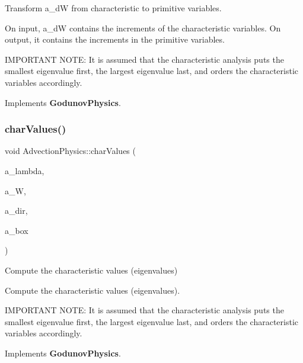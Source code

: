 Transform a\+\_\+dW from characteristic to primitive variables. 

On input, a\+\_\+dW contains the increments of the characteristic variables. On output, it contains the increments in the primitive variables.

I\+M\+P\+O\+R\+T\+A\+NT N\+O\+TE\+: It is assumed that the characteristic analysis puts the smallest eigenvalue first, the largest eigenvalue last, and orders the characteristic variables accordingly. 

Implements \textbf{ Godunov\+Physics}.

\mbox{\label{class_advection_physics_ac3c19f3db60ae92b995ff3d0cdc3f8dc}} 
\subsubsection{\texorpdfstring{char\+Values()}{charValues()}}
{\footnotesize\ttfamily void Advection\+Physics\+::char\+Values (\begin{DoxyParamCaption}\item[{\textbf{ F\+Array\+Box} \&}]{a\+\_\+lambda,  }\item[{const \textbf{ F\+Array\+Box} \&}]{a\+\_\+W,  }\item[{const int \&}]{a\+\_\+dir,  }\item[{const \textbf{ Box} \&}]{a\+\_\+box }\end{DoxyParamCaption})\hspace{0.3cm}{\ttfamily [virtual]}}



Compute the characteristic values (eigenvalues) 

Compute the characteristic values (eigenvalues).

I\+M\+P\+O\+R\+T\+A\+NT N\+O\+TE\+: It is assumed that the characteristic analysis puts the smallest eigenvalue first, the largest eigenvalue last, and orders the characteristic variables accordingly. 

Implements \textbf{ Godunov\+Physics}.

\mbox{\label{class_advection_physics_a469e6262703804372173e378c37b735f}} 
